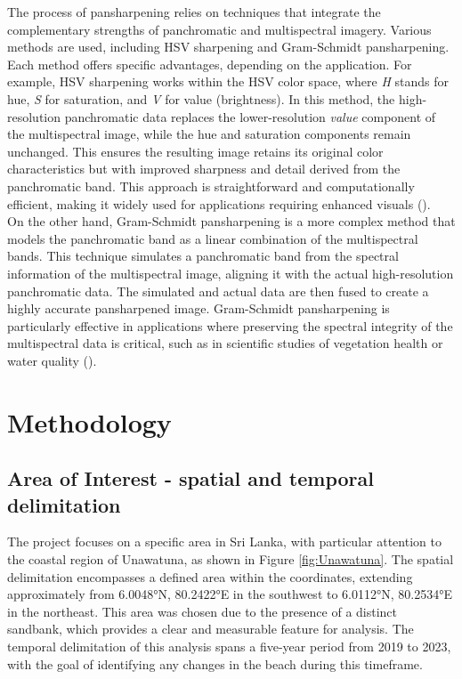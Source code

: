 \documentclass[a4paper,12pt]{article}
\begin{document}
The process of pansharpening relies on techniques that integrate the complementary strengths of panchromatic and multispectral imagery. Various methods are used, including HSV sharpening and Gram-Schmidt pansharpening. Each method offers specific advantages, depending on the application. For example, HSV sharpening works within the HSV color space, where \textit{H} stands for hue, \textit{S} for saturation, and \textit{V} for value (brightness). In this method, the high-resolution panchromatic data replaces the lower-resolution \textit{value} component of the multispectral image, while the hue and saturation components remain unchanged. This ensures the resulting image retains its original color characteristics but with improved sharpness and detail derived from the panchromatic band. This approach is straightforward and computationally efficient, making it widely used for applications requiring enhanced visuals (\cite{arcgis_grundlagen_nodate}).\\
On the other hand, Gram-Schmidt pansharpening is a more complex method that models the panchromatic band as a linear combination of the multispectral bands. This technique simulates a panchromatic band from the spectral information of the multispectral image, aligning it with the actual high-resolution panchromatic data. The simulated and actual data are then fused to create a highly accurate pansharpened image. Gram-Schmidt pansharpening is particularly effective in applications where preserving the spectral integrity of the multispectral data is critical, such as in scientific studies of vegetation health or water quality (\cite{arcgis_grundlagen_nodate}).

\newpage

\section{Methodology}
\subsection{Area of Interest - spatial and temporal delimitation}
The project focuses on a specific area in Sri Lanka, with particular attention to the coastal region of Unawatuna, as shown in Figure \ref{fig:Unawatuna}. The spatial delimitation encompasses a defined area within the coordinates, extending approximately from 6.0048°N, 80.2422°E in the southwest to 6.0112°N, 80.2534°E in the northeast. This area was chosen due to the presence of a distinct sandbank, which provides a clear and measurable feature for analysis. The temporal delimitation of this analysis spans a five-year period from 2019 to 2023, with the goal of identifying any changes in the beach during this timeframe.
\end{document}
